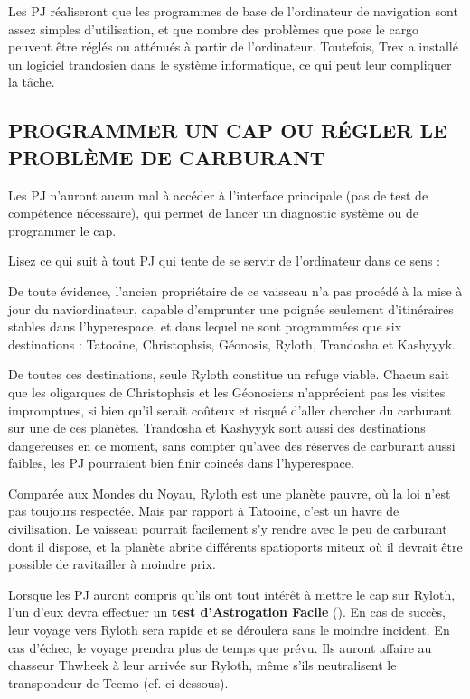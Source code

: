 \documentclass[a4paper,10pt,twoside,twocolumn,openany]{book}
\begin{document}
Les PJ réaliseront que les programmes de base de l’ordinateur de navigation sont assez simples d’utilisation, et
que nombre des problèmes que pose le cargo peuvent
être réglés ou atténués à partir de l’ordinateur.
Toutefois, Trex a installé un logiciel trandosien dans
le système informatique, ce qui peut leur compliquer
la tâche.

\subsection{PROGRAMMER UN CAP OU RÉGLER LE
PROBLÈME DE CARBURANT}
Les PJ n’auront aucun mal à accéder à l’interface principale (pas de test de compétence nécessaire), qui permet de lancer un diagnostic système ou de programmer
le cap.

Lisez ce qui suit à tout PJ qui tente de se servir de l’ordinateur dans ce sens :

\begin{quotebox}
    
De toute évidence, l’ancien propriétaire de ce vaisseau n’a pas procédé à la mise à jour du naviordinateur, capable d’emprunter une poignée seulement d’itinéraires stables dans l’hyperespace, et
dans lequel ne sont programmées que six destinations : Tatooine, Christophsis, Géonosis, Ryloth,
Trandosha et Kashyyyk.

De toutes ces destinations, seule Ryloth constitue
un refuge viable. Chacun sait que les oligarques
de Christophsis et les Géonosiens n’apprécient
pas les visites impromptues, si bien qu’il serait
coûteux et risqué d’aller chercher du carburant
sur une de ces planètes. Trandosha et Kashyyyk
sont aussi des destinations dangereuses en ce
moment, sans compter qu’avec des réserves de
carburant aussi faibles, les PJ pourraient bien finir
coincés dans l’hyperespace.

Comparée aux Mondes du Noyau, Ryloth est
une planète pauvre, où la loi n’est pas toujours
respectée. Mais par rapport à Tatooine, c’est un
havre de civilisation. Le vaisseau pourrait facilement s’y rendre avec le peu de carburant dont
il dispose, et la planète abrite différents spatioports miteux où il devrait être possible de ravitailler à moindre prix.
\end{quotebox}

Lorsque les PJ auront compris qu’ils ont tout intérêt
à mettre le cap sur Ryloth, l’un d’eux devra effectuer un
\textbf{test d’Astrogation Facile} (\difficulty). En cas de succès, leur
voyage vers Ryloth sera rapide et se déroulera sans le
moindre incident. En cas d’échec, le voyage prendra
plus de temps que prévu. Ils auront affaire au chasseur
Thwheek à leur arrivée sur Ryloth, même s’ils neutralisent le transpondeur de Teemo (cf. ci-dessous).
\end{document}
